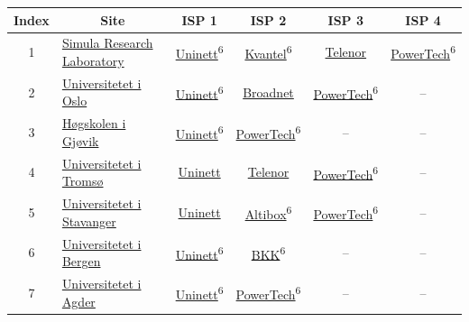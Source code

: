 \begin{small}
\begin{center}
\begin{longtable}{|c|c|c|c|c|c|}
 \hline
 Index & Site & ISP 1 & ISP 2 & ISP 3 & ISP 4 \\ \hline
 1 & \multicolumn{1}{|l|}{\index{Simula Research Laboratory}\index{Site!Simula Research Laboratory}\hyperref[sec:SRL]{Simula Research Laboratory}} & \href{https://www.uninett.no}{Uninett}\textsuperscript{6} & \href{http://kvantel.no}{Kvantel}\textsuperscript{6} & \href{https://www.telenor.no}{Telenor} & \href{http://www.powertech.no}{PowerTech}\textsuperscript{6} \\ \hline
 2 & \multicolumn{1}{|l|}{\index{Universitetet i Oslo}\index{Site!Universitetet i Oslo}\hyperref[sec:UiO]{Universitetet i Oslo}} & \href{https://www.uninett.no}{Uninett}\textsuperscript{6} & \href{https://www.broadnet.no}{Broadnet} & \href{http://www.powertech.no}{PowerTech}\textsuperscript{6} & – \\ \hline
 3 & \multicolumn{1}{|l|}{\index{Høgskolen i Gjøvik}\index{Site!Høgskolen i Gjøvik}\hyperref[sec:HiG]{Høgskolen i Gjøvik}} & \href{https://www.uninett.no}{Uninett}\textsuperscript{6} & \href{http://www.powertech.no}{PowerTech}\textsuperscript{6} & – & – \\ \hline
 4 & \multicolumn{1}{|l|}{\index{Universitetet i Tromsø}\index{Site!Universitetet i Tromsø}\hyperref[sec:UiT]{Universitetet i Tromsø}} & \href{https://www.uninett.no}{Uninett} & \href{https://www.telenor.no}{Telenor} & \href{http://www.powertech.no}{PowerTech}\textsuperscript{6} & – \\ \hline
 5 & \multicolumn{1}{|l|}{\index{Universitetet i Stavanger}\index{Site!Universitetet i Stavanger}\hyperref[sec:UiS]{Universitetet i Stavanger}} & \href{https://www.uninett.no}{Uninett} & \href{https://www.altibox.no}{Altibox}\textsuperscript{6} & \href{http://www.powertech.no}{PowerTech}\textsuperscript{6} & – \\ \hline
 6 & \multicolumn{1}{|l|}{\index{Universitetet i Bergen}\index{Site!Universitetet i Bergen}\hyperref[sec:UiB]{Universitetet i Bergen}} & \href{https://www.uninett.no}{Uninett}\textsuperscript{6} & \href{http://bkk.no}{BKK}\textsuperscript{6} & – & – \\ \hline
 7 & \multicolumn{1}{|l|}{\index{Universitetet i Agder}\index{Site!Universitetet i Agder}\hyperref[sec:UiA]{Universitetet i Agder}} & \href{https://www.uninett.no}{Uninett}\textsuperscript{6} & \href{http://www.powertech.no}{PowerTech}\textsuperscript{6} & – & – \\ \hline

\end{longtable}
\end{center}
\end{small}
